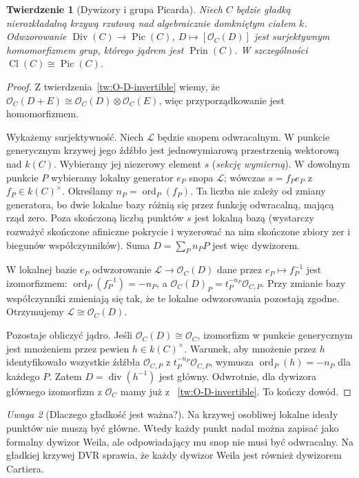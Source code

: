 \documentclass[11pt,a4paper,openany]{report}
\numberwithin{equation}{section}
\theoremstyle{plain}
\newtheorem{twierdzenie}{Twierdzenie}[section]
\theoremstyle{definition}
\theoremstyle{remark}
\newtheorem{uwaga}[twierdzenie]{Uwaga}
\begin{document}
\begin{twierdzenie}[Dywizory i grupa Picarda]
\label{tw:Pic-div}
Niech $C$ będzie gładką nierozkładalną krzywą
rzutową nad algebraicznie domkniętym ciałem $k$.
Odwzorowanie
$\operatorname{Div}(C)\to\operatorname{Pic}(C)$,
$D\mapsto[\mathcal O_C(D)]$ jest surjektywnym
homomorfizmem grup, którego jądrem jest
$\operatorname{Prin}(C)$. W szczególności
$\operatorname{Cl}(C)\cong\operatorname{Pic}(C)$.
\end{twierdzenie}
\begin{proof}
Z twierdzenia~\ref{tw:O-D-invertible} wiemy, że
$\mathcal O_C(D+E)\cong\mathcal O_C(D)\otimes
\mathcal O_C(E)$, więc przyporządkowanie jest
homomorfizmem.

Wykażemy surjektywność. Niech $\mathcal L$ będzie
snopem odwracalnym. W punkcie generycznym krzywej
jego źdźbło jest jednowymiarową przestrzenią
wektorową nad $k(C)$. Wybieramy jej niezerowy
element $s$ (\emph{sekcję wymierną}). W dowolnym
punkcie $P$ wybieramy lokalny generator $e_P$
snopa $\mathcal L$; wówczas $s=f_Pe_P$ z
$f_P\in k(C)^\times$. Określamy
$n_P=\operatorname{ord}_P(f_P)$. Ta liczba nie
zależy od zmiany generatora, bo dwie lokalne
bazy różnią się przez funkcję odwracalną,
mającą rząd zero. Poza skończoną liczbą punktów
$s$ jest lokalną bazą (wystarczy rozważyć
skończone afiniczne pokrycie i wyzerować na nim
skończone zbiory zer i biegunów współczynników).
Suma $D=\sum_P n_PP$ jest więc dywizorem.

W lokalnej bazie $e_P$ odwzorowanie
$\mathcal L\to\mathcal O_C(D)$ dane przez
$e_P\mapsto f_P^{-1}$ jest izomorfizmem:
$\operatorname{ord}_P(f_P^{-1})=-n_P$, a
$\mathcal O_C(D)_P=t_P^{-n_P}\mathcal O_{C,P}$.
Przy zmianie bazy współczynniki zmieniają się
tak, że te lokalne odwzorowania pozostają
zgodne. Otrzymujemy $\mathcal L\cong\mathcal O_C(D)$.

Pozostaje obliczyć jądro. Jeśli
$\mathcal O_C(D)\cong\mathcal O_C$, izomorfizm
w punkcie generycznym jest mnożeniem przez
pewien $h\in k(C)^\times$. Warunek, aby
mnożenie przez $h$ identyfikowało wszystkie
źdźbła $\mathcal O_{C,P}$ z
$t_P^{-n_P}\mathcal O_{C,P}$, wymusza
$\operatorname{ord}_P(h)=-n_P$ dla każdego $P$.
Zatem $D=\operatorname{div}(h^{-1})$ jest główny.
Odwrotnie, dla dywizora głównego izomorfizm
z $\mathcal O_C$ mamy już z
~\ref{tw:O-D-invertible}. To kończy dowód.
\end{proof}

\begin{uwaga}[Dlaczego gładkość jest ważna?]
Na krzywej osobliwej lokalne ideały punktów
nie muszą być główne. Wtedy każdy punkt nadal
można zapisać jako formalny dywizor Weila,
ale odpowiadający mu snop nie musi być odwracalny.
Na gładkiej krzywej DVR sprawia, że każdy
dywizor Weila jest również dywizorem Cartiera.
\end{uwaga}
\end{document}
